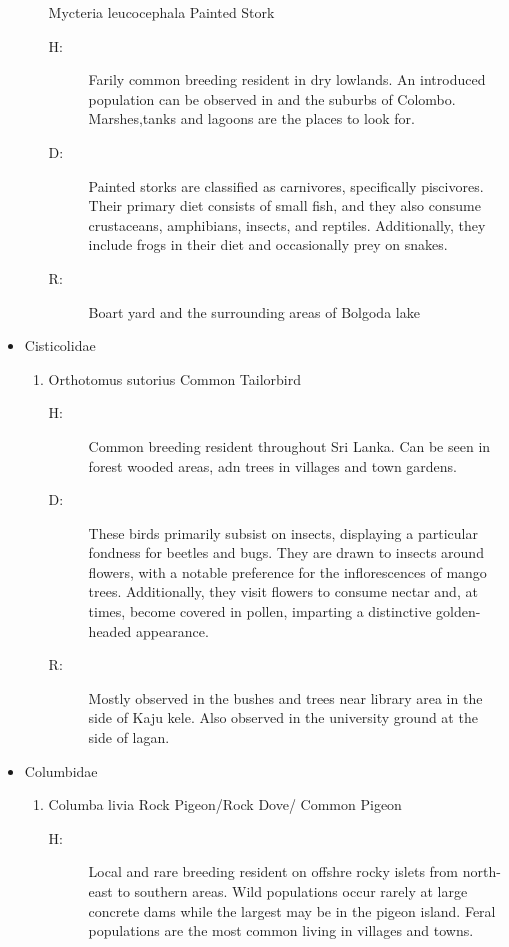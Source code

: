 \begin{itemize}
\begin{enumerate}
Mycteria leucocephala\newline%
Painted Stork%
\begin{description}%
\item[H: ]%
Farily common breeding resident in dry lowlands. An introduced population can be observed in and the suburbs of Colombo. Marshes,tanks and lagoons are the places to look for.%
\item[D: ]%
Painted storks are classified as carnivores, specifically piscivores. Their primary diet consists of small fish, and they also consume crustaceans, amphibians, insects, and reptiles. Additionally, they include frogs in their diet and occasionally prey on snakes.%
\item[R: ]%
Boart yard and the surrounding areas of Bolgoda lake%
\end{description}%
\end{enumerate}%
\item%
Cisticolidae%
\begin{enumerate}%
\item%
Orthotomus sutorius\newline%
Common Tailorbird%
\begin{description}%
\item[H: ]%
Common breeding resident throughout Sri Lanka. Can be seen in forest wooded areas, adn trees in villages and town gardens.%
\item[D: ]%
These birds primarily subsist on insects, displaying a particular fondness for beetles and bugs. They are drawn to insects around flowers, with a notable preference for the inflorescences of mango trees. Additionally, they visit flowers to consume nectar and, at times, become covered in pollen, imparting a distinctive golden{-}headed appearance.%
\item[R: ]%
Mostly observed in the bushes and trees near library area in the side of Kaju kele. Also observed in the university ground at the side of lagan.%
\end{description}%
\end{enumerate}%
\item%
Columbidae%
\begin{enumerate}%
\item%
Columba livia\newline%
Rock Pigeon/Rock Dove/ Common Pigeon%
\begin{description}%
\item[H: ]%
Local and rare breeding resident on offshre rocky islets from north{-}east to southern areas. Wild populations occur rarely at large concrete dams while the largest may be in the pigeon island. Feral populations are the most common living in villages and towns. %

\end{description}
\end{enumerate}
\end{itemize}
